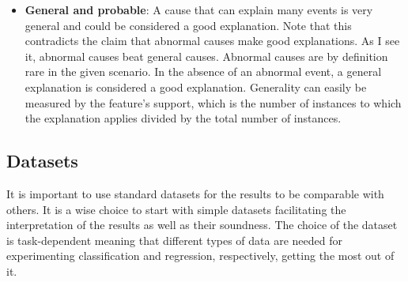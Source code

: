 \begin{itemize}
    \item \textbf{General and probable}: A cause that can explain many events is very general and could be considered a good explanation. Note that this contradicts the claim that abnormal causes make good explanations. As I see it, abnormal causes beat general causes. Abnormal causes are by definition rare in the given scenario. In the absence of an abnormal event, a general explanation is considered a good explanation. Generality can easily be measured by the feature’s support, which is the number of instances to which the explanation applies divided by the total number of instances.
\end{itemize}

\subsection{Datasets}
It is important to use standard datasets for the results to be comparable with others.
It is a wise choice to start with simple datasets facilitating the interpretation of the results as
well as their soundness.
The choice of the dataset is task-dependent meaning that different types of data are needed
for experimenting classification and regression, respectively, getting the most out of it.
